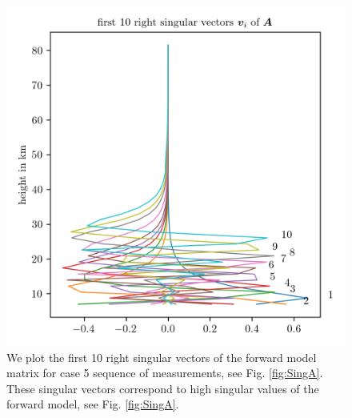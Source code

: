 \begin{figure}[ht!]
	\centering
	\includegraphics{SingVecA.png}
	\caption[First 10 right singular vectors of forward model.]{We plot the first 10 right singular vectors of the forward model matrix for case 5 sequence of measurements, see Fig. \ref{fig:SingA}. These singular vectors correspond to high singular values of the forward model, see Fig. \ref{fig:SingA}.}
	\label{fig:SingVecA}
\end{figure}

